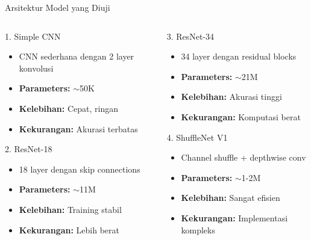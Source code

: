 \documentclass[aspectratio=169]{beamer}
\begin{document}
\begin{frame}{Arsitektur Model yang Diuji}
\begin{columns}[T]
\begin{column}{0.5\textwidth}
\begin{block}{1. Simple CNN}
\begin{itemize}
    \item CNN sederhana dengan 2 layer konvolusi
    \item \textbf{Parameters:} $\sim$50K
    \item \textbf{Kelebihan:} Cepat, ringan
    \item \textbf{Kekurangan:} Akurasi terbatas
\end{itemize}
\end{block}

\begin{block}{2. ResNet-18}
\begin{itemize}
    \item 18 layer dengan skip connections
    \item \textbf{Parameters:} $\sim$11M
    \item \textbf{Kelebihan:} Training stabil
    \item \textbf{Kekurangan:} Lebih berat
\end{itemize}
\end{block}
\end{column}

\begin{column}{0.5\textwidth}
\begin{block}{3. ResNet-34}
\begin{itemize}
    \item 34 layer dengan residual blocks
    \item \textbf{Parameters:} $\sim$21M
    \item \textbf{Kelebihan:} Akurasi tinggi
    \item \textbf{Kekurangan:} Komputasi berat
\end{itemize}
\end{block}

\begin{block}{4. ShuffleNet V1}
\begin{itemize}
    \item Channel shuffle + depthwise conv
    \item \textbf{Parameters:} $\sim$1-2M
    \item \textbf{Kelebihan:} Sangat efisien
    \item \textbf{Kekurangan:} Implementasi kompleks
\end{itemize}
\end{block}
\end{column}
\end{columns}
\end{frame}
\end{document}
